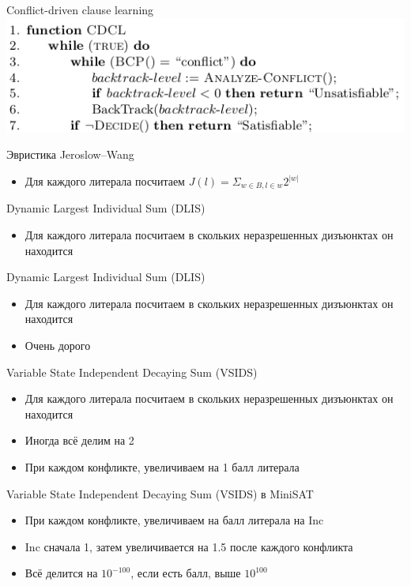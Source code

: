 \documentclass{beamer}
\begin{document}
\begin{frame}{Conflict-driven clause learning}
\includegraphics[scale=0.6]{CDCL.png}
\end{frame}

\begin{frame}{Эвристика Jeroslow–Wang}
\begin{itemize}
\item Для каждого литерала посчитаем\newline
$J(l) = \Sigma_{w \in B, l \in w}2^{|w|}$
\end{itemize}
\end{frame}

\begin{frame}{Dynamic Largest Individual Sum (DLIS)}
\begin{itemize}
\item Для каждого литерала посчитаем в скольких неразрешенных дизъюнктах он находится
\end{itemize}
\end{frame}

\begin{frame}{Dynamic Largest Individual Sum (DLIS)}
\begin{itemize}
\item Для каждого литерала посчитаем в скольких неразрешенных дизъюнктах он находится
\item Очень дорого
\end{itemize}
\end{frame}

\begin{frame}{Variable State Independent Decaying Sum (VSIDS)}
\begin{itemize}
\item Для каждого литерала посчитаем в скольких неразрешенных дизъюнктах он находится
\item Иногда всё делим на 2
\item При каждом конфликте, увеличиваем на 1 балл литерала
\end{itemize}
\end{frame}

\begin{frame}{Variable State Independent Decaying Sum (VSIDS) в MiniSAT}
\begin{itemize}
\item При каждом конфликте, увеличиваем на балл литерала на Inc
\item Inc сначала 1, затем увеличивается на 1.5 после каждого конфликта
\item Всё делится на $10^{-100}$, если есть балл, выше $10^{100}$
\end{itemize}
\end{frame}
\end{document}
